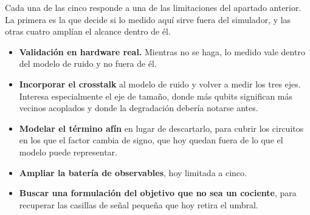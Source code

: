 Cada una de las cinco responde a una de las limitaciones del apartado anterior. La primera es la que decide si lo
medido aquí sirve fuera del simulador, y las otras cuatro amplían el alcance dentro de él.

\begin{itemize}
    \item \textbf{Validación en hardware real.} Mientras no se haga, lo medido
          vale dentro del modelo de ruido y no fuera de él.
    \item \textbf{Incorporar el crosstalk} al modelo de ruido y volver a medir los tres ejes.
          Interesa especialmente el eje de tamaño, donde más qubits significan más vecinos
          acoplados y donde la degradación debería notarse antes.
    \item \textbf{Modelar el término afín} en lugar de descartarlo, para cubrir los circuitos
          en los que el factor cambia de signo, que hoy quedan fuera de lo que el modelo puede
          representar.
    \item \textbf{Ampliar la batería de observables}, hoy limitada a cinco.
    \item \textbf{Buscar una formulación del objetivo que no sea un cociente}, para recuperar
          las casillas de señal pequeña que hoy retira el umbral.
\end{itemize}
